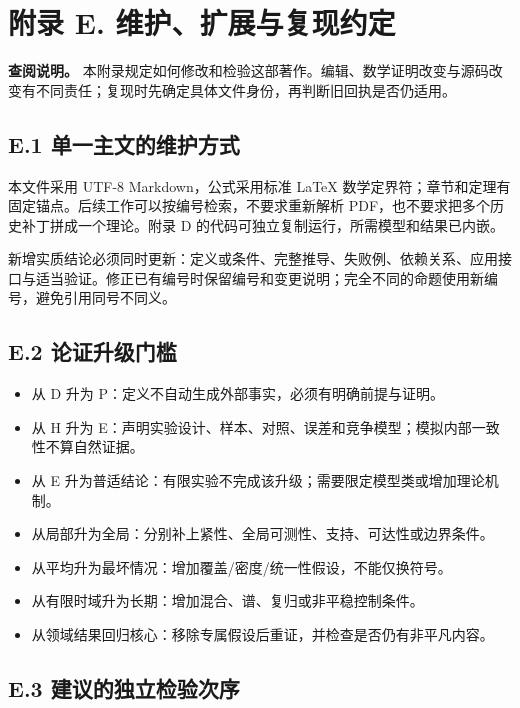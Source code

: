 \documentclass[
  11pt,
  oneside]{book}
\providecommand{\tightlist}{%
  \setlength{\itemsep}{0pt}\setlength{\parskip}{0pt}}
\begin{document}
\chapter{附录 E. 维护、扩展与复现约定}\label{appendix-e}

\textbf{查阅说明。} 本附录规定如何修改和检验这部著作。编辑、数学证明改变与源码改变有不同责任；复现时先确定具体文件身份，再判断旧回执是否仍适用。

\section{E.1 单一主文的维护方式}\label{e.1-ux5355ux4e00ux4e3bux6587ux7684ux7ef4ux62a4ux65b9ux5f0f}

本文件采用 UTF-8 Markdown，公式采用标准 LaTeX 数学定界符；章节和定理有固定锚点。后续工作可以按编号检索，不要求重新解析 PDF，也不要求把多个历史补丁拼成一个理论。附录 D 的代码可独立复制运行，所需模型和结果已内嵌。

新增实质结论必须同时更新：定义或条件、完整推导、失败例、依赖关系、应用接口与适当验证。修正已有编号时保留编号和变更说明；完全不同的命题使用新编号，避免引用同号不同义。

\section{E.2 论证升级门槛}\label{e.2-ux8bbaux8bc1ux5347ux7ea7ux95e8ux69db}

\begin{itemize}
\tightlist
\item
  从 D 升为 P：定义不自动生成外部事实，必须有明确前提与证明。
\item
  从 H 升为 E：声明实验设计、样本、对照、误差和竞争模型；模拟内部一致性不算自然证据。
\item
  从 E 升为普适结论：有限实验不完成该升级；需要限定模型类或增加理论机制。
\item
  从局部升为全局：分别补上紧性、全局可测性、支持、可达性或边界条件。
\item
  从平均升为最坏情况：增加覆盖/密度/统一性假设，不能仅换符号。
\item
  从有限时域升为长期：增加混合、谱、复归或非平稳控制条件。
\item
  从领域结果回归核心：移除专属假设后重证，并检查是否仍有非平凡内容。
\end{itemize}

\section{E.3 建议的独立检验次序}\label{e.3-ux5efaux8baeux7684ux72ecux7acbux68c0ux9a8cux6b21ux5e8f}
\end{document}

